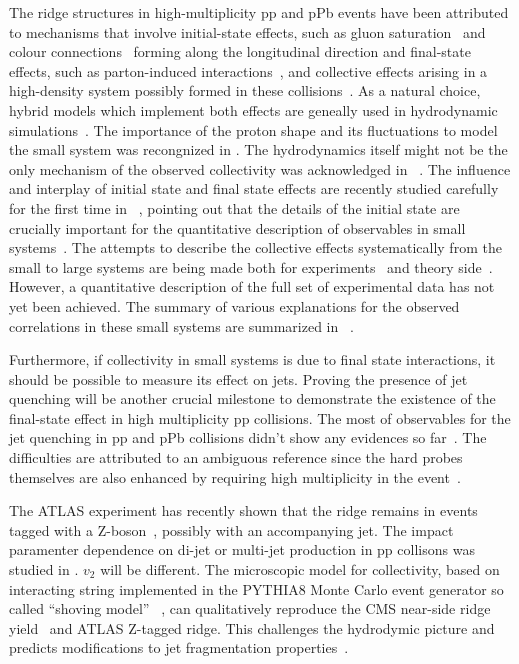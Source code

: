 The ridge structures in high-multiplicity pp and pPb events have been attributed to mechanisms that involve initial-state effects, such as gluon saturation~\cite{Dusling:2012cg} and colour connections~\cite{Sarma:2019teo} forming along the longitudinal direction and final-state effects, such as parton-induced interactions~\cite{Arbuzov:2011yr}, and collective effects arising in a high-density system possibly formed in these collisions~\cite{Zhao:2017rgg}. 
As a natural choice, hybrid models which implement both effects are geneally used in hydrodynamic simulations~\cite{Greif:2017bnr,Mantysaari:2017cni}. 
The importance of the proton shape and its fluctuations to model the small system was recongnized in \cite{Mantysaari:2017cni}.
The hydrodynamics itself might not be the only mechanism of the observed collectivity was acknowledged in ~\cite{Zhao:2020pty}. 
The influence and interplay of initial state and final state effects are recently studied carefully for the first time in ~\cite{Greif:2019ygb}, pointing out that the details of the initial state are crucially important for the quantitative description of observables in small systems~\cite{Schenke:2019pmk}. 
The attempts to describe the collective effects systematically from the small to large systems are being made both for experiments~\cite{Acharya:2019vdf} and theory side~\cite{Greif:2019ygb}.
However, a quantitative description of the full set of experimental data has not yet been achieved.
The summary of various explanations for the observed correlations in these small systems are summarized in ~\cite{Strickland:2018exs}.

Furthermore, if collectivity in small systems is due to final state interactions, it should be possible to measure its effect on jets. Proving the presence of jet quenching will be another crucial milestone to demonstrate the existence of the final-state effect in high multiplicity pp collisions. The most of observables for the jet quenching in pp and pPb collisions didn't show any evidences so far~\cite{}. The difficulties are attributed to an ambiguous reference since the hard probes themselves are also enhanced by requiring high multiplicity in the event~\cite{}.

The ATLAS experiment has recently shown that the ridge remains in events tagged with a Z-boson~\cite{Aaboud:2019mcw}, possibly with an accompanying jet.
The impact paramenter dependence on di-jet or multi-jet production in pp collisons was studied in \cite{Frankfurt:2003td}. $v_2$ will be different.
The microscopic model for collectivity, based on interacting string implemented in the PYTHIA8 Monte Carlo event generator so called ``shoving model''~\cite{Bierlich:2017vhg} , can qualitatively reproduce the CMS near-side ridge yield~\cite{Khachatryan:2016txc} and ATLAS Z-tagged ridge. This challenges the hydrodymic picture and predicts modifications to jet fragmentation
properties~\cite{Bierlich:2019ixq}.

